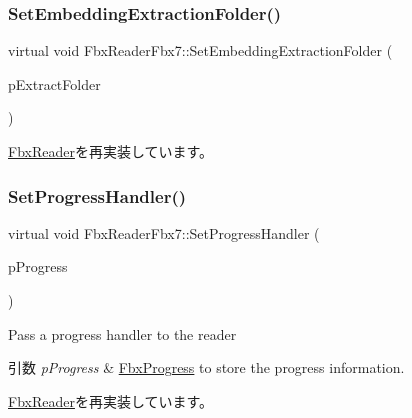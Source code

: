 \subsubsection{\texorpdfstring{Set\+Embedding\+Extraction\+Folder()}{SetEmbeddingExtractionFolder()}}
{\footnotesize\ttfamily virtual void Fbx\+Reader\+Fbx7\+::\+Set\+Embedding\+Extraction\+Folder (\begin{DoxyParamCaption}\item[{const char $\ast$}]{p\+Extract\+Folder }\end{DoxyParamCaption})\hspace{0.3cm}{\ttfamily [virtual]}}



\hyperlink{class_fbx_reader_a640eef510ddb298b2eaad0545b79de66}{Fbx\+Reader}を再実装しています。

\mbox{\label{class_fbx_reader_fbx7_a513e9084df22767dfaf95252d815abbf}} 
\subsubsection{\texorpdfstring{Set\+Progress\+Handler()}{SetProgressHandler()}}
{\footnotesize\ttfamily virtual void Fbx\+Reader\+Fbx7\+::\+Set\+Progress\+Handler (\begin{DoxyParamCaption}\item[{\hyperlink{class_fbx_progress}{Fbx\+Progress} $\ast$}]{p\+Progress }\end{DoxyParamCaption})\hspace{0.3cm}{\ttfamily [virtual]}}

Pass a progress handler to the reader 
\begin{DoxyParams}{引数}
{\em p\+Progress} & \hyperlink{class_fbx_progress}{Fbx\+Progress} to store the progress information. \\
\hline
\end{DoxyParams}


\hyperlink{class_fbx_reader_aeba190e276718b1abfa6c26a83d2c363}{Fbx\+Reader}を再実装しています。

\mbox{\label{class_fbx_reader_fbx7_ab6283b540d9ea9141c9338400e1b8455}} 
